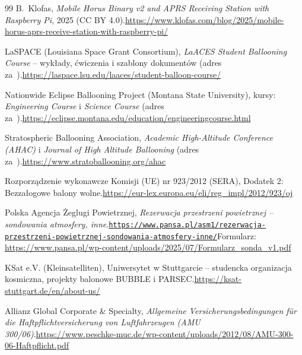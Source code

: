 \begin{thebibliography}{99}
 B.~Klofas, \emph{Mobile Horus Binary v2 and APRS Receiving Station with Raspberry Pi}, 2025 (CC BY 4.0).\newline\url{https://www.klofas.com/blog/2025/mobile-horus-aprs-receive-station-with-raspberry-pi/}

 LaSPACE (Louisiana Space Grant Consortium), \emph{LaACES Student Ballooning Course} -- wykłady, ćwiczenia i szablony dokumentów (adres za~\cite{nasahb}).\newline\url{https://laspace.lsu.edu/laaces/student-balloon-course/}

 Nationwide Eclipse Ballooning Project (Montana State University), kursy: \emph{Engineering Course} i \emph{Science Course} (adres za~\cite{nasahb}).\newline\url{https://eclipse.montana.edu/education/engineeringcourse.html}

 Stratospheric Ballooning Association, \emph{Academic High-Altitude Conference (AHAC)} i \emph{Journal of High Altitude Ballooning} (adres za~\cite{nasahb}).\newline\url{https://www.stratoballooning.org/ahac}

 Rozporządzenie wykonawcze Komisji (UE) nr 923/2012 (SERA), Dodatek 2: Bezzałogowe balony wolne.\newline\url{https://eur-lex.europa.eu/eli/reg_impl/2012/923/oj}

 Polska Agencja Żeglugi Powietrznej, \emph{Rezerwacja przestrzeni powietrznej -- sondowania atmosfery, inne}.\newline\href{https://www.pansa.pl/asm1/rezerwacja-przestrzeni-powietrznej-sondowania-atmosfery-inne/}{\nolinkurl{https://www.pansa.pl/asm1/}}\newline\href{https://www.pansa.pl/asm1/rezerwacja-przestrzeni-powietrznej-sondowania-atmosfery-inne/}{\nolinkurl{rezerwacja-przestrzeni-powietrznej-sondowania-atmosfery-inne/}}\newline Formularz: \url{https://www.pansa.pl/wp-content/uploads/2025/07/Formularz_sonda_v1.pdf}

 KSat e.V. (Kleinsatelliten), Uniwersytet w Stuttgarcie -- studencka organizacja kosmiczna, projekty balonowe BUBBLE i PARSEC.\newline\url{https://ksat-stuttgart.de/en/about-us/}

 Allianz Global Corporate \& Specialty, \emph{Allgemeine Versicherungsbedingungen für die Haftpflichtversicherung von Luftfahrzeugen (AMU 300/06)}.\newline\url{https://www.peschke-muc.de/wp-content/uploads/2012/08/AMU-300-06-Haftpflicht.pdf}


\end{thebibliography}
